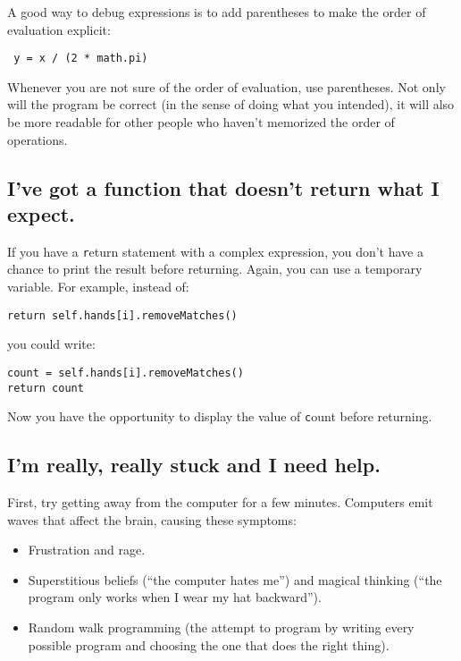 \documentclass[
DIV=11,
fontsize=12,
twoside,
headinclude=false,
titlepage=firstiscover,
abstract=true,
headsepline=true,
footsepline=true,
chapterprefix=true, %
headings=big,
bibliography=totoc,%
captions=tableheading
]{scrbook}
\theoremstyle{definition}
\begin{document}
A good way to debug expressions is to add parentheses to make
the order of evaluation explicit:

\begin{lstlisting}
 y = x / (2 * math.pi)
\end{lstlisting}
%
Whenever you are not sure of the order of evaluation, use
parentheses.  Not only will the program be correct (in the sense
of doing what you intended), it will also be more readable for
other people who haven't memorized the order of operations.


\subsection{I've got a function that doesn't return what I
expect.}

If you have a {\texttt return} statement with a complex expression,
you don't have a chance to print the result before
returning.  Again, you can use a temporary variable.  For
example, instead of:

\begin{lstlisting}
return self.hands[i].removeMatches()
\end{lstlisting}
%
you could write:

\begin{lstlisting}
count = self.hands[i].removeMatches()
return count
\end{lstlisting}
%
Now you have the opportunity to display the value of
{\texttt count} before returning.


\subsection{I'm really, really stuck and I need help.}

First, try getting away from the computer for a few minutes.
Computers emit waves that affect the brain, causing these
symptoms:

\begin{itemize}

\item Frustration and rage.

\item Superstitious beliefs (``the computer hates me'') and
magical thinking (``the program only works when I wear my
hat backward'').

\item Random walk programming (the attempt to program by writing
every possible program and choosing the one that does the right
thing).

\end{itemize}
\end{document}
